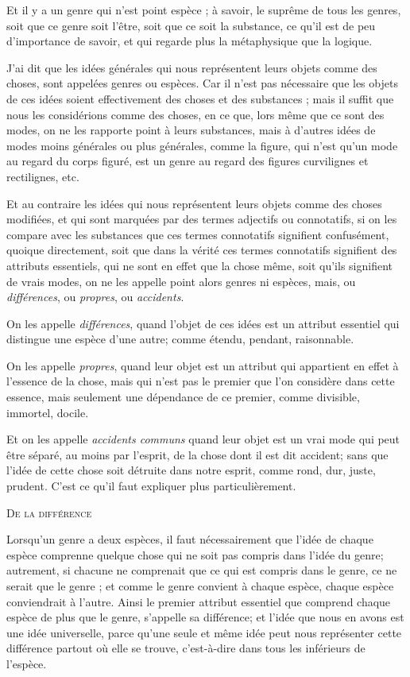 Et il y a un genre qui n'est point espèce ; à savoir, le suprême de tous les genres, soit que ce genre soit l'être, soit que ce soit la substance, ce qu'il est de peu d'importance de savoir, et qui regarde plus la métaphysique que la logique.

J'ai dit que les idées générales qui nous représentent leurs objets comme des choses, sont appelées genres ou espèces. Car il n'est pas nécessaire que les objets de ces idées soient effectivement des choses et des substances ; mais il suffit que nous les considérions comme des choses, en ce que, lors même que ce sont des modes, on ne les rapporte point à leurs substances, mais à d'autres idées de modes moins générales ou plus générales, comme la figure, qui n'est qu'un mode au regard du corps figuré, est un genre au regard des figures curvilignes et rectilignes, etc.

Et au contraire les idées qui nous représentent leurs objets comme des choses modifiées, et qui sont marquées par des termes adjectifs ou connotatifs, si on les compare avec les substances que ces termes connotatifs signifient confusément, quoique directement, soit que dans la vérité ces termes connotatifs signifient des attributs essentiels, qui ne sont en effet que la chose même, soit qu'ils signifient de vrais modes, on ne les appelle point alors genres ni espèces, mais, ou \emph{différences}, ou \emph{propres}, ou \emph{accidents}.

On les appelle \emph{différences}, quand l'objet de ces idées est un attribut essentiel qui distingue une espèce d'une autre; comme étendu, pendant, raisonnable.

On les appelle \emph{propres}, quand leur objet est un attribut qui appartient en effet à l'essence de la chose, mais qui n'est pas le premier que l'on considère dans cette essence, mais seulement une dépendance de ce premier, comme divisible, immortel, docile.

Et on les appelle \emph{accidents communs} quand leur objet est un vrai mode qui peut être séparé, au moins par l'esprit, de la chose dont il est dit accident; sans que l'idée de cette chose soit détruite dans notre esprit, comme rond, dur, juste, prudent. C'est ce qu'il faut expliquer plus particulièrement.

\begin{center}{\large\scshape De la différence}\end{center}

Lorsqu'un genre a deux espèces, il faut nécessairement que l'idée de chaque espèce comprenne quelque chose qui ne soit pas compris dans l'idée du genre; autrement, si chacune ne comprenait que ce qui est compris dans le genre, ce ne serait que le genre ; et comme le genre convient à chaque espèce, chaque espèce conviendrait à l'autre. Ainsi le premier attribut essentiel que comprend chaque espèce de plus que le genre, s'appelle sa différence; et l'idée que nous en avons est une idée universelle, parce qu'une seule et même idée peut nous représenter cette différence partout où elle se trouve, c'est-à-dire dans tous les inférieurs de l'espèce.

